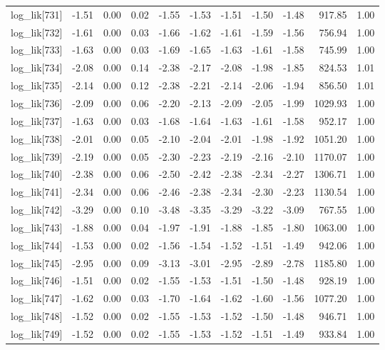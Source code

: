 \begin{table}[ht]
\begin{tabular}{rrrrrrrrrrr}
  log\_lik[731] & -1.51 & 0.00 & 0.02 & -1.55 & -1.53 & -1.51 & -1.50 & -1.48 & 917.85 & 1.00 \\ 
  log\_lik[732] & -1.61 & 0.00 & 0.03 & -1.66 & -1.62 & -1.61 & -1.59 & -1.56 & 756.94 & 1.00 \\ 
  log\_lik[733] & -1.63 & 0.00 & 0.03 & -1.69 & -1.65 & -1.63 & -1.61 & -1.58 & 745.99 & 1.00 \\ 
  log\_lik[734] & -2.08 & 0.00 & 0.14 & -2.38 & -2.17 & -2.08 & -1.98 & -1.85 & 824.53 & 1.01 \\ 
  log\_lik[735] & -2.14 & 0.00 & 0.12 & -2.38 & -2.21 & -2.14 & -2.06 & -1.94 & 856.50 & 1.01 \\ 
  log\_lik[736] & -2.09 & 0.00 & 0.06 & -2.20 & -2.13 & -2.09 & -2.05 & -1.99 & 1029.93 & 1.00 \\ 
  log\_lik[737] & -1.63 & 0.00 & 0.03 & -1.68 & -1.64 & -1.63 & -1.61 & -1.58 & 952.17 & 1.00 \\ 
  log\_lik[738] & -2.01 & 0.00 & 0.05 & -2.10 & -2.04 & -2.01 & -1.98 & -1.92 & 1051.20 & 1.00 \\ 
  log\_lik[739] & -2.19 & 0.00 & 0.05 & -2.30 & -2.23 & -2.19 & -2.16 & -2.10 & 1170.07 & 1.00 \\ 
  log\_lik[740] & -2.38 & 0.00 & 0.06 & -2.50 & -2.42 & -2.38 & -2.34 & -2.27 & 1306.71 & 1.00 \\ 
  log\_lik[741] & -2.34 & 0.00 & 0.06 & -2.46 & -2.38 & -2.34 & -2.30 & -2.23 & 1130.54 & 1.00 \\ 
  log\_lik[742] & -3.29 & 0.00 & 0.10 & -3.48 & -3.35 & -3.29 & -3.22 & -3.09 & 767.55 & 1.00 \\ 
  log\_lik[743] & -1.88 & 0.00 & 0.04 & -1.97 & -1.91 & -1.88 & -1.85 & -1.80 & 1063.00 & 1.00 \\ 
  log\_lik[744] & -1.53 & 0.00 & 0.02 & -1.56 & -1.54 & -1.52 & -1.51 & -1.49 & 942.06 & 1.00 \\ 
  log\_lik[745] & -2.95 & 0.00 & 0.09 & -3.13 & -3.01 & -2.95 & -2.89 & -2.78 & 1185.80 & 1.00 \\ 
  log\_lik[746] & -1.51 & 0.00 & 0.02 & -1.55 & -1.53 & -1.51 & -1.50 & -1.48 & 928.19 & 1.00 \\ 
  log\_lik[747] & -1.62 & 0.00 & 0.03 & -1.70 & -1.64 & -1.62 & -1.60 & -1.56 & 1077.20 & 1.00 \\ 
  log\_lik[748] & -1.52 & 0.00 & 0.02 & -1.55 & -1.53 & -1.52 & -1.50 & -1.48 & 946.71 & 1.00 \\ 
  log\_lik[749] & -1.52 & 0.00 & 0.02 & -1.55 & -1.53 & -1.52 & -1.51 & -1.49 & 933.84 & 1.00 \\ 

\end{tabular}
\end{table}
